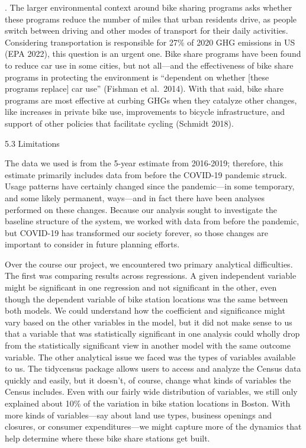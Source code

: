 \documentclass[
  12pt,
]{article}
\begin{document}
. The larger environmental context around bike sharing programs asks
whether these programs reduce the number of miles that urban residents
drive, as people switch between driving and other modes of transport for
their daily activities. Considering transportation is responsible for
27\% of 2020 GHG emissions in US (EPA 2022), this question is an urgent
one. Bike share programs have been found to reduce car use in some
cities, but not all---and the effectiveness of bike share programs in
protecting the environment is ``dependent on whether {[}these programs
replace{]} car use'' (Fishman et al.~2014). With that said, bike share
programs are most effective at curbing GHGs when they catalyze other
changes, like increases in private bike use, improvements to bicycle
infrastructure, and support of other policies that facilitate cycling
(Schmidt 2018).

5.3 Limitations

The data we used is from the 5-year estimate from 2016-2019; therefore,
this estimate primarily includes data from before the COVID-19 pandemic
struck. Usage patterns have certainly changed since the pandemic---in
some temporary, and some likely permanent, ways---and in fact there have
been analyses performed on these changes. Because our analysis sought to
investigate the baseline structure of the system, we worked with data
from before the pandemic, but COVID-19 has transformed our society
forever, so those changes are important to consider in future planning
efforts.

Over the course our project, we encountered two primary analytical
difficulties. The first was comparing results across regressions. A
given independent variable might be significant in one regression and
not significant in the other, even though the dependent variable of bike
station locations was the same between both models. We could understand
how the coefficient and significance might vary based on the other
variables in the model, but it did not make sense to us that a variable
that was statistically significant in one analysis could wholly drop
from the statistically significant view in another model with the same
outcome variable. The other analytical issue we faced was the types of
variables available to us. The tidycensus package allows users to access
and analyze the Census data quickly and easily, but it doesn't, of
course, change what kinds of variables the Census includes. Even with
our fairly wide distribution of variables, we still only explained about
10\% of the variation in bike station locations in Boston. With more
kinds of variables---say about land use types, business openings and
closures, or consumer expenditures---we might capture more of the
dynamics that help determine where these bike share stations get built.
\end{document}
